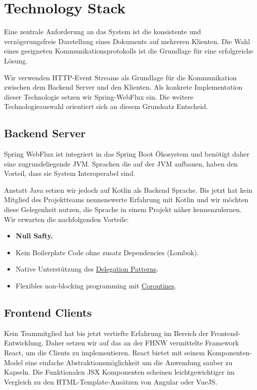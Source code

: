\section{Technology Stack}

Eine zentrale Anforderung an das System ist die konsistente und verzögerungsfreie Darstellung eines Dokuments auf mehreren Klienten.
Die Wahl eines geeigneten Kommunikationsprotokolls ist die Grundlage für eine erfolgreiche Lösung.

Wir verwenden HTTP-Event Streams als Grundlage für die Kommunikation zwischen dem Backend Server und den Klienten.
Als konkrete Implementation dieser Technologie setzen wir Spring-WebFlux ein.
Die weitere Technologieauswahl orientiert sich an diesem Grundsatz Entscheid.

\subsection{Backend Server}
Spring WebFlux ist integriert in das Spring Boot Ökosystem und benötigt daher eine zugrundeliegende JVM\@.
Sprachen die auf der JVM aufbauen, haben den Vorteil, dass sie System Interoperabel sind.

Anstatt Java setzen wir jedoch auf Kotlin als Backend Sprache.
Bis jetzt hat kein Mitglied des Projektteams nennenswerte Erfahrung mit Kotlin und wir möchten diese Gelegenheit nutzen,
die Sprache in einem Projekt näher kennenzulernen.
Wir erwarten die nachfolgenden Vorteile:

\begin{itemize}
    \item \textbf{Null Safty.}
    \item Kein Boilerplate Code ohne zusatz Dependencies (Lombok).
    \item Native Unterstützung des \textcolor{blue}{\href{https://en.wikipedia.org/wiki/Delegation_pattern}{Delegation Patterns}}.
    \item Flexibles non-blocking programming mit \textcolor{blue}{\href{https://kotlinlang.org/docs/coroutines-overview.html}{Coroutines}}.
\end{itemize}


\subsection{Frontend Clients}
Kein Teammitglied hat bis jetzt vertiefte Erfahrung im Bereich der Frontend-Entwicklung.
Daher setzen wir auf das an der FHNW vermittelte Framework React, um die Clients zu implementieren.
React bietet mit seinem Komponenten-Model eine einfache Abstraktionsmöglichkeit um die Anwendung sauber zu Kapseln.
Die Funktionalen JSX Komponenten scheinen leichtgewichtiger im Vergleich zu den HTML-Template-Ansätzen von Angular oder VueJS\@.

